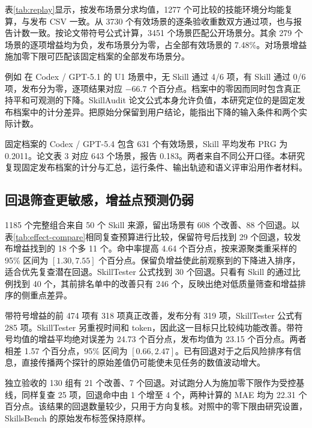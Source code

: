 \documentclass[final,5p,twocolumn,10pt]{elsarticle}
\begin{document}
表\ref{tab:replay}显示，按发布场景分求均值，1277 个可比较的技能环境分均能复算，与发布 CSV 一致。从 3730 个有效场景的逐条验收重数双方通过项，也与报告计数一致。按论文带符号公式计算，3451 个场景匹配公开场景分。其余 279 个场景的逐项增益均为负，发布场景分为零，占全部有效场景的 7.48\%。对场景增益施加零下限可匹配该固定档案的全部发布场景分。

例如  在 Codex / GPT-5.1 的 U1 场景中，无 Skill 通过 4/6 项，有 Skill 通过 0/6 项，发布分为零，逐项结果对应 $-66.7$ 个百分点。档案中的零因而同时包含真正持平和可观测的下降。SkillAudit 论文公式本身允许负值，本研究定位的是固定发布档案中的计分差异。把原始分保留到用户结论，能指出下降的输入条件和两个实际计数。

固定档案的 Codex / GPT-5.4 包含 631 个有效场景，Skill 平均发布 PRG 为 0.2011。论文表 3 对应 643 个场景，报告 0.183。两者来自不同公开口径。本研究复现固定发布档案的计分与汇总，运行条件、输出轨迹和语义评审沿用作者材料。

\subsection{回退筛查更敏感，增益点预测仍弱}

1185 个完整组合来自 50 个 Skill 来源，留出场景有 608 个改善、88 个回退。以表\ref{tab:effect-compare}相同复查预算进行比较，保留符号后找到 29 个回退，较发布增益找到的 18 个多 11 个。命中率提高 4.64 个百分点，按来源聚类重采样的 95\% 区间为 $[1.30,7.55]$ 个百分点。保留负增益使此前观察到的下降进入排序，适合优先复查潜在回退。SkillTester 公式找到 30 个回退。只看有 Skill 的通过比例找到 40 个，其前排名单中的改善只有 246 个，反映出绝对低质量筛查和增益排序的侧重点差异。

带符号增益的前 474 项有 318 项真正改善，发布分有 319 项，SkillTester 公式有 285 项。SkillTester 另重视时间和 token，因此这一目标只比较纯功能改善。带符号均值的增益平均绝对误差为 24.73 个百分点，发布均值为 23.15 个百分点。两者相差 1.57 个百分点，95\% 区间为 $[0.66,2.47]$。已有回退对于之后风险排序有信息，直接传播两个探针的原始差值仍可能使未见任务的数值波动增大。

独立验收的 130 组有 21 个改善、7 个回退。对试跑分人为施加零下限作为受控基线，同样复查 25 项，回退命中由 1 个增至 4 个，两种计算的 MAE 均为 22.31 个百分点。该结果的回退数量较少，只用于方向复核。对照中的零下限由研究设置，SkillsBench 的原始发布标签保持原样。
\end{document}
